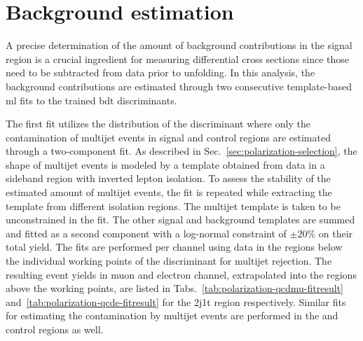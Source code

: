 \section{Background estimation}
\label{sec:polarization-fit}

A precise determination of the amount of background contributions in the signal region is a crucial ingredient for measuring differential cross sections since those need to be subtracted from data prior to unfolding. In this analysis, the background contributions are estimated through two consecutive template-based \gls{ml} fits to the trained \gls{bdt} discriminants.

The first fit utilizes the distribution of the \bdtqcd discriminant where only the contamination of multijet events in signal and control regions are estimated through a two-component fit. As described in Sec.~\ref{sec:polarization-selection}, the shape of multijet events is modeled by a template obtained from data in a sideband region with inverted lepton isolation. To assess the stability of the estimated amount of multijet events, the fit is repeated while extracting the template from different isolation regions. The multijet template is taken to be unconstrained in the fit. The other signal and background templates are summed and fitted as a second component with a log-normal constraint of $\pm20\%$ on their total yield. The fits are performed per channel using data in the regions below the individual working points of the \bdtqcd discriminant for multijet rejection. The resulting event yields in muon and electron channel, extrapolated into the regions above the working points, are listed in Tabs.~\ref{tab:polarization-qcdmu-fitresult} and~\ref{tab:polarization-qcde-fitresult} for the 2j1t region respectively. Similar fits for estimating the contamination by multijet events are performed in the \wjets and \ttbar control regions as well.


